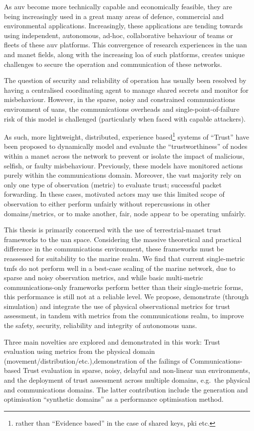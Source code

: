 As \gls{auv} become more technically capable and economically feasible, they are being increasingly used in a great many areas of defence, commercial and environmental applications. 
Increasingly, these applications are tending towards using independent, autonomous, ad-hoc, collaborative behaviour of teams or fleets of these \gls{auv} platforms.
This convergence of research experiences in the \gls{uan} and \gls{manet} fields, along with the increasing \gls{loa} of such platforms, creates unique challenges to secure the operation and communication of these networks.

The question of security and reliability of operation has usually been resolved by having a centralised coordinating agent to manage shared secrets and monitor for misbehaviour.
However, in the sparse, noisy and constrained communications environment of \glspl{uan}, the communications overheads and single-point-of-failure risk of this model is challenged (particularly when faced with capable attackers).

As such, more lightweight, distributed, experience based\footnote{rather than ``Evidence based'' in the case of shared keys, \gls{pki} etc.} systems of ``Trust'' have been proposed to dynamically model and evaluate the ``trustworthiness'' of nodes within a \gls{manet} across the network to prevent or isolate the impact of malicious, selfish, or faulty misbehaviour. 
Previously, these models have monitored actions purely within the communications domain. 
Moreover, the vast majority rely on only one type of observation (metric) to evaluate trust; successful packet forwarding.
In these cases, motivated actors may use this limited scope of observation to either perform unfairly without repercussions in other domains/metrics, or to make another, fair, node appear to be operating unfairly.

This thesis is primarily concerned with the use of terrestrial-\gls{manet} trust frameworks to the \gls{uan} space. 
Considering the massive theoretical and practical difference in the communications environment, these frameworks must be reassessed for suitability to the marine realm. 
We find that current single-metric \glspl{tmf} do not perform well in a best-case scaling of the marine network, due to sparse and noisy observation metrics, and while basic multi-metric communications-only frameworks perform better than their single-metric forms, this performance is still not at a reliable level. 
We propose, demonstrate (through simulation) and integrate the use of physical observational metrics for trust assessment, in tandem with metrics from the communications realm, to improve the safety, security, reliability and integrity of autonomous \glspl{uan}.

Three main novelties are explored and demonstrated in this work:
Trust evaluation using metrics from the physical domain (movement/distribution/etc.),demonstration of the failings of Communications-based Trust evaluation in sparse, noisy, delayful and non-linear \gls{uan} environments, and the deployment of trust assessment across multiple domains, e.g.\ the physical and communications domains.
The latter contribution include the generation and optimisation ``synthetic domains'' as a performance optimisation method.
